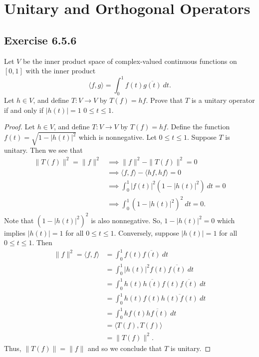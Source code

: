 \section{Unitary and Orthogonal Operators}

\subsection*{Exercise 6.5.6} Let \( V  \) be the inner product space of complex-valued continuous functions on \( [0,1] \) with the inner product 
\[  \langle f , g \rangle = \int_{ 0 }^{ 1 } f(t) \overline{g(t)} \ dt. \]
Let \( h \in V  \), and define \( T: V \to V  \) by \( T(f) = hf \). Prove that \( T  \) is a unitary operator if and only if \( | h(t) | = 1  \) \( 0 \leq t \leq 1  \).
\begin{proof}
Let \( h \in V  \), and define \( T: V \to V  \) by \( T(f) = hf \). Define the function \( f(t) = \sqrt{ 1 - | h(t) |^{2} }   \) which is nonnegative. Let \( 0 \leq t \leq 1  \). Suppose \( T  \) is unitary.
Then we see that
\begin{align*}
    \|T(f)\|^{2} = \|f\|^{2} &\implies  \|f\|^{2} - \|T(f)\|^{2} = 0   \\
                             &\implies \langle f , f \rangle - \langle hf  , hf  \rangle = 0 \\ 
                             &\implies \int_{ 0 }^{ 1 }  | f(t) |^{2} (1 - | h(t) |^{2})   \ dt = 0 \\
                             &\implies \int_{ 0 }^{ 1 }  (1 - | h(t) |^{2})^{2} \ dt = 0. 
\end{align*}
Note that \( (1-| h(t) |^{2})^{2} \) is also nonnegative. So, \( 1 - | h(t) |^{2} = 0  \) which implies \( | h(t) |  =  1  \) for all \( 0 \leq t \leq 1  \). Conversely, suppose \( |h(t)| = 1   \) for all \( 0 \leq t \leq 1  \). Then
\begin{align*}
    \|f\|^{2} = \langle f , f \rangle &= \int_{ 0 }^{ 1 }  f(t) \overline{f(t)} \ dt \\
                                      &= \int_{ 0 }^{ 1 }  | h(t) |^{2} f(t) \overline{f(t)} \ dt \\
                                      &= \int_{ 0 }^{ 1 }  h(t) \overline{h(t)} f(t) \overline{f(t)} \ dt \\
                                      &= \int_{ 0 }^{ 1 }  h(t)f(t) \overline{h(t)f(t)}  \ dt \\
                                      &= \int_{ 0 }^{ 1 }  hf(t) \overline{hf(t)} \ dt \\
                                      &= \langle T(f) , T(f) \rangle \\
                                      &= \|T(f)\|^{2}.
\end{align*}
Thus, \( \|T(f)\| = \|f\| \) and so we conclude that \( T  \) is unitary.
\end{proof}

